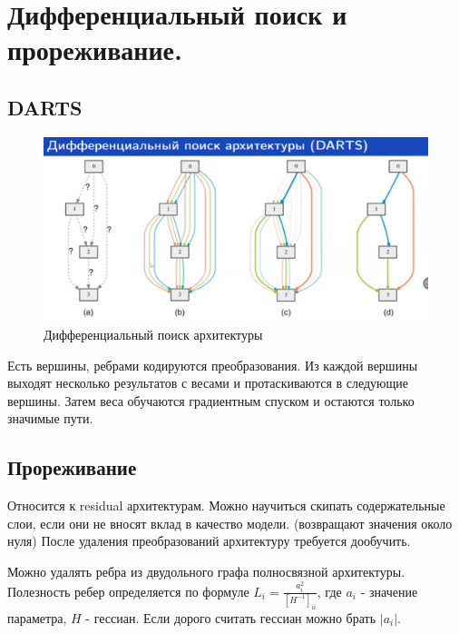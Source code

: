 \section{Дифференциальный поиск и прореживание.}

\subsection*{DARTS}

\begin{figure}[H]
	\centering
	\includegraphics[scale=.4]{images/darts}
	\caption{Дифференциальный поиск архитектуры}
\end{figure}

Есть вершины, ребрами кодируются преобразования. Из каждой вершины
выходят несколько результатов с весами и протаскиваются в следующие
вершины. Затем веса обучаются градиентным спуском и остаются
только значимые пути.

\subsection*{Прореживание}

Относится к residual архитектурам. Можно научиться скипать
содержательные слои, если они не вносят вклад в качество модели.
(возвращают значения около нуля) После удаления преобразований
архитектуру требуется дообучить.

Можно удалять ребра из двудольного графа полносвязной архитектуры.
Полезность ребер определяется по формуле $L_i = \frac{a_i^2}{[H^{-1}]_{ii}}$,
где $a_i$ - значение параметра, $H$ - гессиан. Если дорого
считать гессиан можно брать $|a_i|$.
